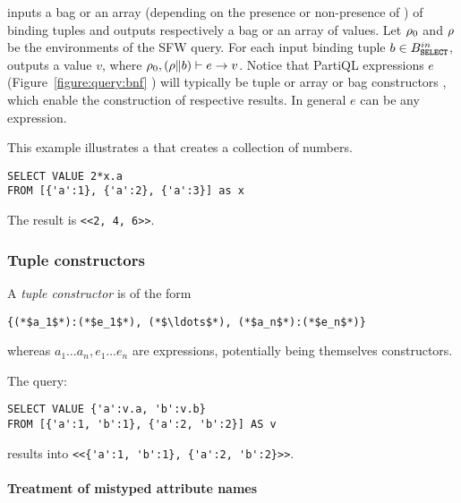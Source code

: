 \noindent inputs a bag or an array (depending on the presence or non-presence of
) of binding tuples and outputs respectively a bag or an array of
values. Let $\rho_{0}$ and $\rho$ be the environments of the SFW query. For each
input binding tuple $b \in B^{in}_{\texttt{\textbf{SELECT}}}$,  outputs a
value $v$, where $\rho_{0}, (\rho \| b) \vdash e \rightarrow v$. Notice that PartiQL
expressions $e$ (Figure~\ref{figure:query:bnf} ) will typically be
tuple or array or bag constructors , 
which enable the construction of respective results.
In general $e$ can be any expression.

\begin{example}
This example illustrates a  that creates a collection of
numbers.

\begin{lstlisting}
SELECT VALUE 2*x.a
FROM [{'a':1}, {'a':2}, {'a':3}] as x
\end{lstlisting}

The result is \lstinline|<<2, 4, 6>>|.
\end{example}

\subsubsection{Tuple constructors} 
\label{sec:tuple-constructor}

A \textit{tuple constructor} is of the form

\begin{lstlisting}
{(*$a_1$*):(*$e_1$*), (*$\ldots$*), (*$a_n$*):(*$e_n$*)}
\end{lstlisting}

\noindent whereas $a_1 \ldots a_n, e_1 \ldots e_n$ are expressions, potentially
being themselves constructors.

\begin{example}
The query:

\begin{lstlisting}
SELECT VALUE {'a':v.a, 'b':v.b}
FROM [{'a':1, 'b':1}, {'a':2, 'b':2}] AS v
\end{lstlisting}

\noindent results into \lstinline|<<{'a':1, 'b':1}, {'a':2, 'b':2}>>|.
\end{example}

\paragraph{Treatment of mistyped attribute names}

